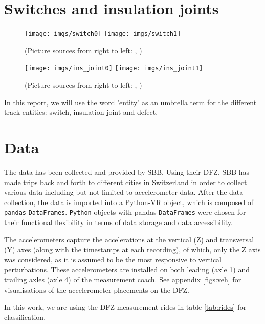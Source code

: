 \section{Switches and insulation joints}

\begin{figure}[H]
	\centering
	\texttt{[image: imgs/switch0]}
	\texttt{[image: imgs/switch1]}
	\caption{(Picture sources from right to left: \cite{swi0:online}, \cite{swi1:online})}
\end{figure}
\begin{figure}[H]
	\centering
	\texttt{[image: imgs/ins\_joint0]}
	\texttt{[image: imgs/ins\_joint1]}
	\caption{(Picture sources from right to left: \cite{ins0:online}, \cite{ins1:online})}
\end{figure}

In this report, we will use the word 'entity' as an umbrella term for the different track entities: switch, insulation joint and defect.

\section{Data}
The data has been collected and provided by SBB. Using their DFZ, SBB has made trips back and forth to different cities in Switzerland in order to collect various data including but not limited to accelerometer data. After the data collection, the data is imported into a Python-VR object, which is composed of \verb|pandas| \verb|DataFrames|. \verb|Python| objects with pandas \verb|DataFrames| were chosen for their functional flexibility in terms of data storage and data accessibility.

The accelerometers capture the accelerations at the vertical (Z) and transversal (Y) axes (along with the timestamps at each recording), of which, only the Z axis was considered, as it is assumed to be the most responsive to vertical perturbations. These accelerometers are installed on both leading (axle 1) and trailing axles (axle 4) of the measurement coach. See appendix \ref{figs:veh} for visualisations of the accelerometer placements on the DFZ. 

In this work, we are using the DFZ measurement rides in table \ref{tab:rides} for classification.

